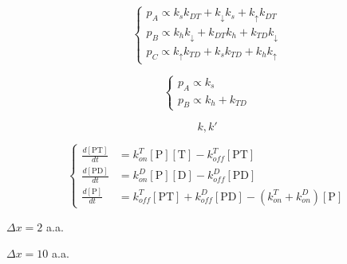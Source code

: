 \documentclass{article}
\begin{document}
\begin{equation}
\begin{cases}
    p_A \propto k_s k_{DT} + k_\downarrow k_s + k_\uparrow k_{DT} \\
    p_B \propto k_h k_\downarrow + k_{DT} k_h + k_{TD} k_\downarrow \\
    p_C \propto k_\uparrow k_{TD} + k_s k_{TD} + k_h k_\uparrow
\end{cases}
\end{equation}

\begin{equation}
\begin{cases}
    p_A \propto k_s \\
    p_B \propto k_h + k_{TD}
\end{cases}
\end{equation}

$$
k, k'
$$

\begin{equation}
\left\{
\begin{split}
    \frac{d[\text{PT}]}{dt} &= k_{on}^T [\text{P}][\text{T}] - k_{off}^T [\text{PT}] \\
    \frac{d[\text{PD}]}{dt} &= k_{on}^D [\text{P}][\text{D}] - k_{off}^D [\text{PD}] \\
    \frac{d[\text{P}]}{dt} &= k_{off}^T [\text{PT}] + k_{off}^D [\text{PD}] - (k_{on}^T + k_{on}^D) [\text{P}]
\end{split}
\right.
\end{equation}

$\Delta x = 2$ a.a.

$\Delta x = 10$ a.a.
\end{document}
